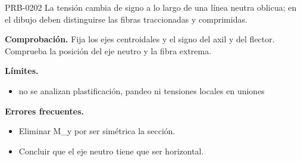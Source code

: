 \begin{studiumworked}{PRB-0202}
La tensión cambia de signo a lo largo de una línea neutra oblicua; en el dibujo deben distinguirse las fibras traccionadas y comprimidas.

\par\textbf{Comprobación.} Fija los ejes centroidales y el signo del axil y del flector. Comprueba la posición del eje neutro y la fibra extrema.

\textbf{Límites.}\begin{itemize}\item no se analizan plastificación, pandeo ni tensiones locales en uniones\end{itemize}

\textbf{Errores frecuentes.}\begin{itemize}\item Eliminar M\_y por ser simétrica la sección.
\item Concluir que el eje neutro tiene que ser horizontal.\end{itemize}

\end{studiumworked}

\Needspace{.3\textheight}

